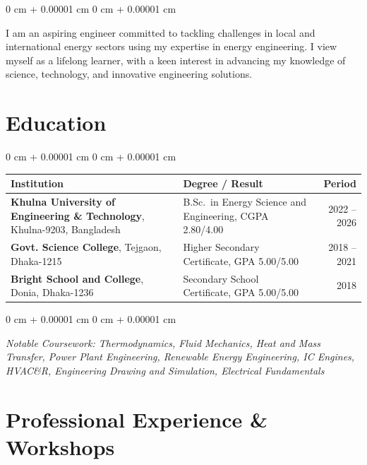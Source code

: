 \documentclass[10pt, letterpaper]{article}
\newenvironment{onecolentry}{
  \begin{adjustwidth}{
      0 cm + 0.00001 cm
    }{
      0 cm + 0.00001 cm
    }
  }{
  \end{adjustwidth}
} %
\begin{document}
\begin{onecolentry}
  I am an aspiring engineer committed to tackling challenges in local and
  international energy sectors using my expertise in energy engineering. I
  view myself as a lifelong learner, with a keen interest in advancing my
  knowledge of science, technology, and innovative engineering solutions.
\end{onecolentry}


\section{Education}

\begin{onecolentry}
  \begin{tabularx}{\textwidth}{@{} X p{7.5cm} r @{}}
    \textbf{Institution} & \textbf{Degree / Result} & \textbf{Period} \\
    \midrule
    \textbf{Khulna University of Engineering \& Technology}, Khulna-9203,
    Bangladesh & B.Sc.\ in Energy Science and Engineering, CGPA
    2.80/4.00 & 2022 -- 2026 \\
    \textbf{Govt. Science College}, Tejgaon, Dhaka-1215 & Higher Secondary
    Certificate, GPA 5.00/5.00 & 2018 -- 2021 \\
    \textbf{Bright School and College}, Donia, Dhaka-1236 & Secondary School
    Certificate, GPA 5.00/5.00 & 2018 \\
    \midrule
  \end{tabularx}
\end{onecolentry}

\vspace{0.1 cm}

\begin{onecolentry}
  \small \textit{Notable Coursework: Thermodynamics, Fluid Mechanics, Heat and
    Mass Transfer, Power Plant Engineering, Renewable Energy
    Engineering, IC Engines, HVAC\&R, Engineering Drawing and
  Simulation, Electrical Fundamentals}
\end{onecolentry}


\section{Professional Experience \& Workshops}
\end{document}
